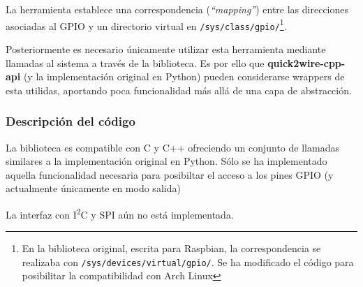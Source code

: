 La herramienta establece una correspondencia (\textit{``mapping''}) entre las direcciones asociadas al GPIO y un directorio virtual en \texttt{/sys/class/gpio/}\footnote{En la biblioteca original, escrita para Raspbian, la correspondencia se realizaba con \texttt{/sys/devices/virtual/gpio/}. Se ha modificado el código para posibilitar la compatibilidad con Arch Linux}.

Posteriormente es necesario únicamente utilizar esta herramienta mediante llamadas al sistema a través de la biblioteca. Es por ello que \textbf{quick2wire-cpp-api} (y la implementación original en Python) pueden considerarse wrappers de esta utilidas, aportando poca funcionalidad más allá de una capa de abstracción.

\subsubsection{Descripción del código}

La biblioteca es compatible con C y C++ ofreciendo un conjunto de llamadas similares a la implementación original en Python. Sólo se ha implementado aquella funcionalidad necesaria para posibiltar el acceso a los pines GPIO (y actualmente únicamente en modo salida) %

La interfaz con I\textsuperscript{2}C y SPI aún no está implementada.